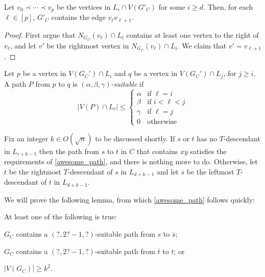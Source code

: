 \documentclass{patmorin}
\newcommand{\defin}[1]{\emph{\textcolor{brightmaroon}{#1}}}
\begin{document}
\begin{clm}
  Let $v_0\prec\cdots\prec v_{p}$ be the vertices in $L_i\cap V(G'_C)$ for some $i\ge d$.  Then, for each $\ell\in[p]$, $G'_C$ contains the edge $v_\ell v_{\ell+1}$.
\end{clm}

\begin{proof}
  First argue that $N_{G_C}(v_\ell)\cap L_i$ contains at least one vertex to the right of $v_\ell$, and let $v'$ be the rightmost vertex in $N_{G_C}(v_\ell)\cap L_i$.  We claim that $v'=v_{\ell+1}$.
\end{proof}

Let $p$ be a vertex in $V(G_C')\cap L_i$ and $q$ be a vertex in $V(G_C')\cap L_j$, for $j\ge i$.  A path $P$ from $p$ to $q$ is \defin{$(\alpha,\beta,\gamma)$-suitable} if
\[
   |V(P)\cap L_\ell|
    \le
      \begin{cases}
        \alpha & \text{if $\ell = i$} \\
        \beta & \text{if $i < \ell < j$} \\
        \gamma & \text{if $\ell = j$} \\
        0 & \text{otherwise}
      \end{cases}
\]

Fix an integer $k\in O(\sqrt{n})$ to be discussed shortly.  If $s$ or $t$ has no $T$-descendant in $L_{i+k-1}$ then the path from $s$ to $t$ in $C$ that contains $xy$ satisfies the requirements of \cref{awesome_path}, and there is nothing more to do.  Otherwise, let $\overline{t}$ be the rightmost $T$-descendant of $s$ in $L_{d+k-1}$ and let $\overline{s}$ be the leftmost $T$-descendant of $t$ in $L_{d+k-1}$.

We will prove the following lemma, from which \cref{awesome_path} follows quickly:

\begin{lem}
  At least one of the following is true:
  \begin{compactenum}[(i)]
    \item $G_C$ contains a $(?,2?-1,?)$-suitable path from $s$ to $\overline{s}$;
    \item $G_C$ contains a $(?,2?-1,?)$-suitable path from $\overline{t}$ to $t$; or
    \item $|V(G_C)|\ge k^2$.
  \end{compactenum}
\end{lem}
\end{document}
